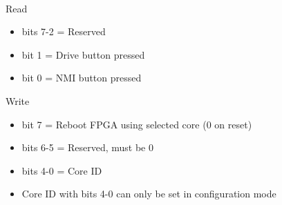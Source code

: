 \\
Read
\begin{itemize}
\item bits 7-2 = Reserved
\item bit 1 = Drive button pressed
\item bit 0 = NMI button pressed
\end{itemize}
Write
\begin{itemize}
\item bit 7 = Reboot FPGA using selected core (0 on reset)
\item bits 6-5 = Reserved, must be 0
\item bits 4-0 = Core ID
\item[] Core ID with bits 4-0 can only be set in configuration mode
\end{itemize}


